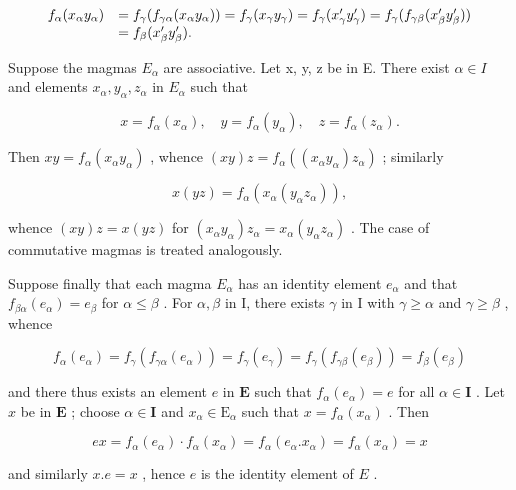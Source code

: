 \[
\begin{array}{r l} f _ {\alpha} (x _ {\alpha} y _ {\alpha}) & = f _ {\gamma} (f _ {\gamma \alpha} (x _ {\alpha} y _ {\alpha})) = f _ {\gamma} (x _ {\gamma} y _ {\gamma}) = f _ {\gamma} (x _ {\gamma} ^ {\prime} y _ {\gamma} ^ {\prime}) = f _ {\gamma} (f _ {\gamma \beta} (x _ {\beta} ^ {\prime} y _ {\beta} ^ {\prime})) \\ & = f _ {\beta} (x _ {\beta} ^ {\prime} y _ {\beta} ^ {\prime}). \end{array}
\]

Suppose the magmas \(E_{\alpha}\) are associative. Let x, y, z be in E. There exist \(\alpha \in I\) and elements \(x_{\alpha}, y_{\alpha}, z_{\alpha}\) in \(E_{\alpha}\) such that

\[
x = f _ {\alpha} (x _ {\alpha}), \quad y = f _ {\alpha} (y _ {\alpha}), \quad z = f _ {\alpha} (z _ {\alpha}).
\]

Then \(xy = f_{\alpha}(x_{\alpha}y_{\alpha})\) , whence \((xy)z = f_{\alpha}((x_{\alpha}y_{\alpha})z_{\alpha})\) ; similarly

\[
x (y z) = f _ {\alpha} \left(x _ {\alpha} \left(y _ {\alpha} z _ {\alpha}\right)\right),
\]

whence \((xy)z = x(yz)\) for \((x_{\alpha}y_{\alpha})z_{\alpha} = x_{\alpha}(y_{\alpha}z_{\alpha})\) . The case of commutative magmas is treated analogously.

Suppose finally that each magma \(E_{\alpha}\) has an identity element \(e_{\alpha}\) and that \(f_{\beta\alpha}(e_{\alpha}) = e_{\beta}\) for \(\alpha \leqslant \beta\) . For \(\alpha, \beta\) in I, there exists \(\gamma\) in I with \(\gamma \geqslant \alpha\) and \(\gamma \geqslant \beta\) , whence

\[
f _ {\alpha} (e _ {\alpha}) = f _ {\gamma} \left(f _ {\gamma \alpha} (e _ {\alpha})\right) = f _ {\gamma} (e _ {\gamma}) = f _ {\gamma} \left(f _ {\gamma \beta} (e _ {\beta})\right) = f _ {\beta} (e _ {\beta})
\]

and there thus exists an element \(e\) in \(\mathbf{E}\) such that \(f_{\alpha}(e_{\alpha}) = e\) for all \(\alpha \in \mathbf{I}\) . Let \(x\) be in \(\mathbf{E}\) ; choose \(\alpha \in \mathbf{I}\) and \(x_{\alpha} \in \mathrm{E}_{\alpha}\) such that \(x = f_{\alpha}(x_{\alpha})\) . Then

\[
e x = f _ {\alpha} (e _ {\alpha}) \cdot f _ {\alpha} (x _ {\alpha}) = f _ {\alpha} (e _ {\alpha}. x _ {\alpha}) = f _ {\alpha} (x _ {\alpha}) = x
\]

and similarly \(x.e = x\) , hence \(e\) is the identity element of \(E\) .

